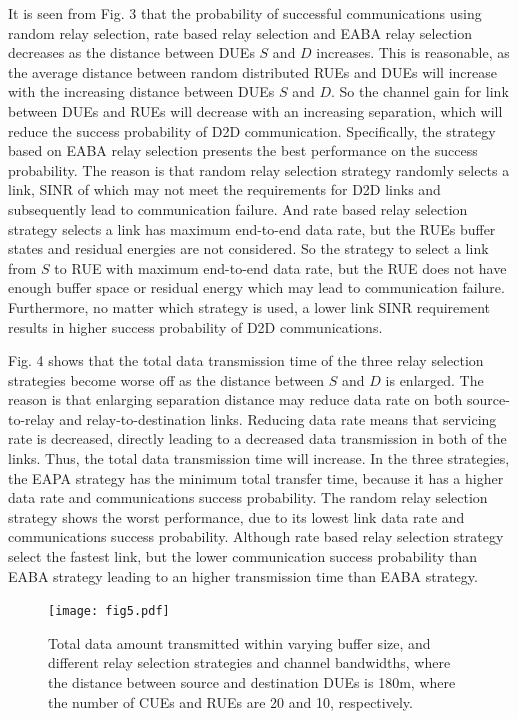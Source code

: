 \documentclass[conference]{IEEEtran}
\begin{document}
It is seen from Fig. 3 that the probability of successful communications using random relay selection, rate based relay selection and EABA relay selection decreases as the distance between DUEs $S$ and $D$ increases. This is reasonable, as the average distance between random distributed RUEs and DUEs will increase with the increasing distance between DUEs $S$ and $D$. So the channel gain for link between DUEs and RUEs will decrease with an increasing separation, which will reduce the success probability of D2D communication. Specifically, the strategy based on EABA relay selection presents the best performance on the success probability. The reason is that random relay selection strategy randomly selects a link, SINR of which may not meet the requirements for D2D links and subsequently lead to communication failure. And rate based relay selection strategy selects a link has maximum end-to-end data rate, but the RUEs buffer states and residual energies are not considered. So the strategy to select a link from $S$ to RUE with maximum end-to-end data rate, but the RUE does not have enough buffer space or residual energy which may lead to communication failure. Furthermore, no matter which strategy is used, a lower link SINR requirement results in higher success probability of D2D communications.

Fig. 4 shows that the total data transmission time of the three relay selection strategies become worse off as the distance between $S$ and $D$ is enlarged. The reason is that enlarging separation distance may reduce data rate on both source-to-relay and relay-to-destination links. Reducing data rate means that servicing rate is decreased, directly leading to a decreased data transmission in both of the links. Thus, the total data transmission time will increase. In the three strategies, the EAPA strategy has the minimum total transfer time, because it has a higher data rate and communications success probability. The random relay selection strategy shows the worst performance, due to its lowest link data rate and communications success probability. Although rate based relay selection strategy select the fastest link, but the lower communication success probability than EABA strategy leading to an higher transmission time than EABA strategy.
\begin{figure}[!t]
\center
\texttt{[image: fig5.pdf]}
\caption{Total data amount transmitted within varying buffer size, and different relay selection strategies and channel bandwidths, where the distance between source and destination DUEs is 180m, where the number of CUEs and RUEs are 20 and 10, respectively.}
\label{fig_time}
\end{figure}
\end{document}

